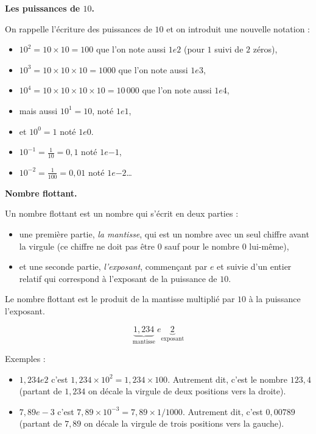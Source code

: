 \documentclass[class=report,crop=false,12pt]{standalone}
\begin{document}
\begin{activite}

\textbf{Les puissances de $10$.}

On rappelle l'écriture des puissances de $10$ et on introduit une nouvelle notation :
\begin{itemize}
  \item $10^2 = 10 \times 10 = 100$ que l'on note aussi $1e2$ (pour $1$ suivi de $2$ zéros),
  \item $10^3 = 10 \times 10 \times 10 = 1000$ que l'on note aussi $1e3$,  
  \item $10^4 = 10 \times 10 \times 10 \times 10 = 10\,000$ que l'on note aussi $1e4$, 
  \item mais aussi $10^1 = 10$, noté $1e1$,
  \item et $10^0 = 1$ noté $1e0$.
  \item $10^{-1}=\frac{1}{10}=0,1$ noté $1e{-1}$,
  \item $10^{-2}=\frac{1}{100}=0,01$ noté $1e{-2}$\ldots    
\end{itemize}

\bigskip
\textbf{Nombre flottant.}

Un nombre flottant est un nombre qui s'écrit en deux parties : 
\begin{itemize}
  \item une première partie, \emph{la mantisse}, qui est un nombre avec un seul chiffre avant la virgule (ce chiffre ne doit pas être $0$ sauf pour le nombre $0$ lui-même),
  \item et une seconde partie, \emph{l'exposant}, commençant par $e$ et suivie d'un entier relatif qui correspond à l'exposant de la puissance de $10$.
\end{itemize} 
Le nombre flottant est le produit de la mantisse multiplié par $10$ à la puissance l'exposant.


$$\underbrace{1,234}_{\text{mantisse}} \ e\underbrace{2}_{\text{exposant}}$$

Exemples :
\begin{itemize}
  \item $1,234e2$ c'est $1,234 \times 10^2 = 1,234 \times 100$. Autrement dit, c'est le nombre $123,4$ (partant de $1,234$ on décale la virgule de deux positions vers la droite).
  
  \item $7,89e-3$ c'est $7,89 \times 10^{-3} = 7,89 \times 1/1000$. Autrement dit, c'est $0,00789$ (partant de $7,89$ on décale la virgule de trois positions vers la gauche).


\end{itemize}
\end{activite}
\end{document}
